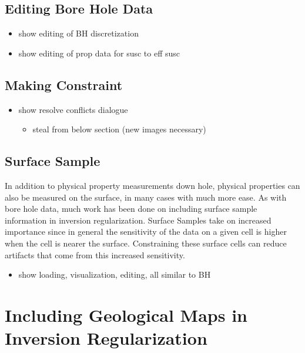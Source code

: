\subsection{Editing Bore Hole Data}
\label{subsec:visBH}

\begin{itemize}
 \item show editing of BH discretization
 \item show editing of prop data for susc to eff susc
\end{itemize}

\subsection{Making Constraint}
\label{subsec:makeConstBH}

\begin{itemize}
 \item show resolve conflicts dialogue
 \begin{itemize}
  \item steal from below section (new images necessary)
 \end{itemize}
\end{itemize}

\subsection{Surface Sample}
\label{subsec:SS}

In addition to physical property measurements down hole, physical properties can also be measured on the surface, in many cases with much more ease. As with bore hole data, much work  has been done on including surface sample information in inversion regularization. Surface Samples take on increased importance since in general the sensitivity of the data on a given cell is higher when the cell is nearer the surface. Constraining these surface cells can reduce artifacts that come from this increased sensitivity.

\begin{itemize}
 \item show loading, visualization, editing, all similar to BH
\end{itemize}


\section{Including Geological Maps in Inversion Regularization}
\label{sec:maps}

